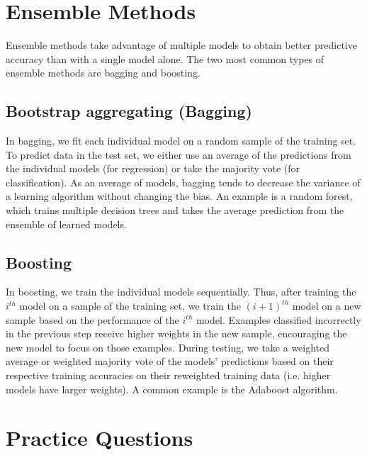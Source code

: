 \documentclass[12pt,letterpaper]{article}
\begin{document}
\section{Ensemble Methods}
Ensemble methods take advantage of multiple models to obtain better predictive accuracy than with a single model alone. The two most common types of ensemble methods are bagging and boosting.

\subsection{Bootstrap aggregating (Bagging)}
In bagging, we fit each individual model on a random sample of the training set. To predict data in the test set, we either use an average of the predictions from the individual models (for regression) or take the majority vote (for classification). As an average of models, bagging tends to decrease the variance of a learning algorithm without changing the bias. An example is a random forest, which trains multiple decision trees and takes the average prediction from the ensemble of learned models.

\subsection{Boosting}

In boosting, we train the individual models sequentially. Thus, after training the $i^{th}$ model on a sample of the training set, we train the $(i+1)^{th}$ model on a new sample based on the performance of the $i^{th}$ model. Examples classified incorrectly in the previous step receive higher weights in the new sample, encouraging the new model to focus on those examples. During testing, we take a weighted average or weighted majority vote of the models' predictions based on their respective training accuracies on their reweighted training data (i.e. higher models have larger weights). A common example is the Adaboost algorithm.

\newpage

\section{Practice Questions}
\end{document}
